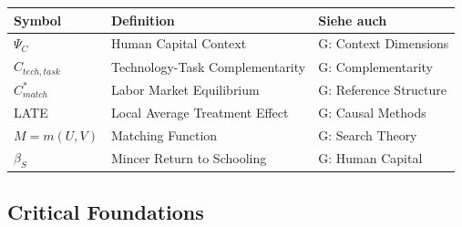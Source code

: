 \begin{center}
\renewcommand{\arraystretch}{1.3}
\begin{tabular}{|l|l|l|}
\hline
\textbf{Symbol} & \textbf{Definition} & \textbf{Siehe auch} \\
\hline
$\Psi_C$ & Human Capital Context & G: Context Dimensions \\
$C_{tech, task}$ & Technology-Task Complementarity & G: Complementarity \\
$C^*_{match}$ & Labor Market Equilibrium & G: Reference Structure \\
LATE & Local Average Treatment Effect & G: Causal Methods \\
$M = m(U,V)$ & Matching Function & G: Search Theory \\
$\beta_S$ & Mincer Return to Schooling & G: Human Capital \\
\hline
\end{tabular}
\end{center}

\subsection{Critical Foundations}
\label{sec:aa-foundations}

